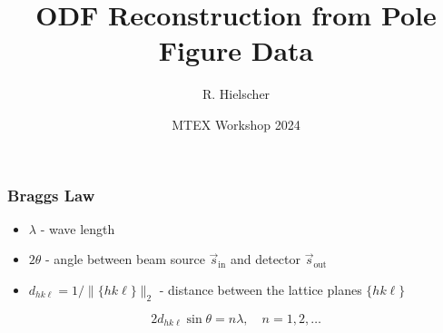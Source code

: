 \documentclass[compress,aspectratio=1610]{beamer}
\author{R. Hielscher}
\title{ODF Reconstruction from Pole Figure Data}
\institute{Faculty of Mathematics,\\
  TU Bergakademie Freiberg, Germany}
\date{MTEX Workshop 2024}
\newcommand{\norm}[1]{\lVert #1\rVert}
\newcommand{\abs}[1]{\lvert #1\rvert}
\begin{document}
\begin{frame}
  \maketitle{}
\end{frame}





\begin{frame}
  \frametitle{Braggs Law}



  \begin{itemize}
  \item $\lambda$ - wave length
  \item $2\theta$ - angle between beam source $\vec s_{\text{in}}$ and
    detector $\vec s_{\text{out}}$

  \item $d_{hk\ell} = 1/\norm{\{hk\ell\}}_{2}$ - distance between the lattice
    planes $\{hk\ell\}$
  \end{itemize}

  \begin{block}{}
    \begin{equation*}
      2 d_{hk\ell} \sin \theta = n \lambda, \quad n = 1,2,\ldots
    \end{equation*}
  \end{block}

  \begin{figure}
  \centering
\end{figure}
\end{frame}
\end{document}

